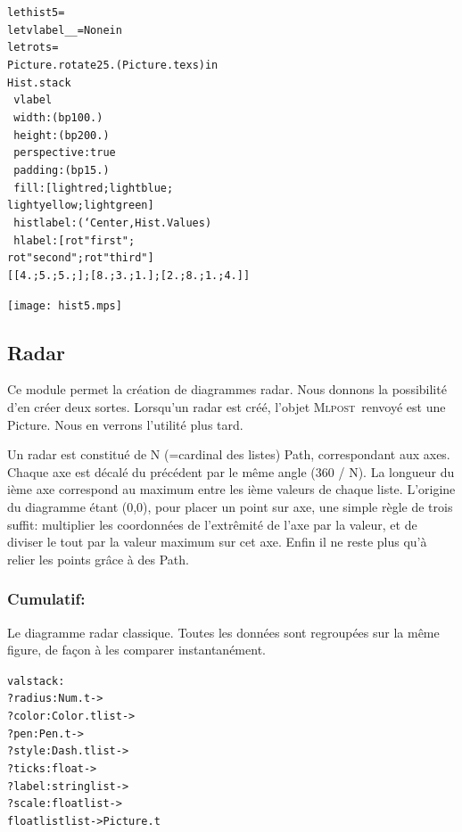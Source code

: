 \documentclass[a4paper,12pt]{article}
\newcommand{\mlpost}{\textsc{Mlpost}}
\begin{document}
\bigskip

\begin{minipage}{0.5\linewidth}
  \begin{alltt}
    let hist5 =
    let vlabel _ _ = None in
    let rot s = 
    Picture.rotate 25. (Picture.tex s) in
    Hist.stack
    ~vlabel
    ~width:(bp 100.)
    ~height:(bp 200.)
    ~perspective:true 
    ~padding:(bp 15.)
    ~fill:[lightred;lightblue;
      lightyellow;lightgreen]
    ~histlabel:(`Center, Hist.Values)
    ~hlabel:[rot "first";
      rot "second";rot "third" ]
    [[4.;5.;5.;]; [8.;3.;1.]; [2.;8.;1.;4.]]
  \end{alltt}
\end{minipage}
\begin{minipage}{0.5\linewidth}
\begin{center}
\texttt{[image: hist5.mps]}
\end{center}
\end{minipage}

\subsection{Radar}
Ce module permet la création de diagrammes radar.
Nous donnons la possibilité d'en créer deux sortes.
Lorsqu'un radar est créé, l'objet \mlpost\ renvoyé est une Picture.
Nous en verrons l'utilité plus tard.

Un radar est constitué de N (=cardinal des listes) Path, correspondant aux axes. Chaque axe est décalé du précédent par le même angle (360 / N).
La longueur du ième axe correspond au maximum entre les ième valeurs de chaque liste. L'origine du diagramme étant (0,0), pour placer un point sur axe, une simple règle de trois suffit: multiplier les coordonnées de l'extrêmité de l'axe par la valeur, et de diviser le tout par la valeur maximum sur cet axe. Enfin il ne reste plus qu'à relier les points grâce à des Path.

\subsubsection{Cumulatif:}
Le diagramme radar classique. Toutes les données sont regroupées sur la même figure, de façon à les comparer instantanément. 
\begin{alltt}
  val stack :
  ?radius:Num.t ->
  ?color:Color.t list ->
  ?pen:Pen.t ->
  ?style:Dash.t list ->
  ?ticks:float ->
  ?label:string list ->
  ?scale:float list ->
  float list list -> Picture.t
\end{alltt}
\end{document}
